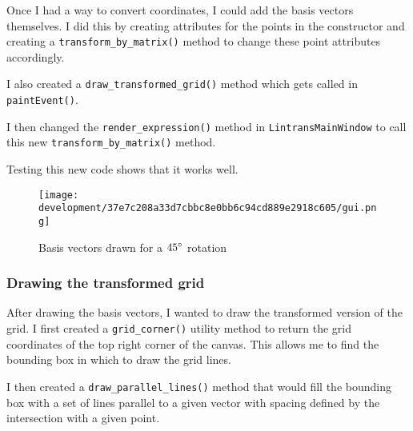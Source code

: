 \documentclass[../development.tex]{subfiles}
\begin{document}

Once I had a way to convert coordinates, I could add the basis vectors themselves. I did this by creating attributes for the points in the constructor and creating a \texttt{transform_by_matrix()} method to change these point attributes accordingly.


I also created a \texttt{draw_transformed_grid()} method which gets called in \texttt{paintEvent()}.


I then changed the \texttt{render_expression()} method in \texttt{LintransMainWindow} to call this new \texttt{transform_by_matrix()} method.


Testing this new code shows that it works well.

\begin{figure}[H]
	\centering
	\texttt{[image: development/37e7c208a33d7cbbc8e0bb6c94cd889e2918c605/gui.png]}
	\caption{Basis vectors drawn for a $45\degree$ rotation}
	\label{fig:development:37e7c208a33d7cbbc8e0bb6c94cd889e2918c605:gui.png}
\end{figure}

\subsubsection{Drawing the transformed grid\label{development:visualizing-matrices:drawing-the-transformed-grid}}

After drawing the basis vectors, I wanted to draw the transformed version of the grid. I first created a \texttt{grid_corner()} utility method to return the grid coordinates of the top right corner of the canvas. This allows me to find the bounding box in which to draw the grid lines.


I then created a \texttt{draw_parallel_lines()} method that would fill the bounding box with a set of lines parallel to a given vector with spacing defined by the intersection with a given point.
\end{document}
